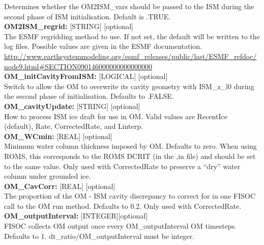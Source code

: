 \documentclass[12pt]{article}
\begin{document}
\begin{flushleft}
Determines whether the OM2ISM\_vars should be passed to the ISM during the 
second phase of ISM initialisation.   Default is .TRUE.                    \\ 
\vspace{6pt}
\textbf{OM2ISM\_regrid:}       [STRING] [optional]                         \\
The ESMF regridding method to use.  If not set, the default will be 
written to the log files.  Possible values are given in the ESMF 
documentation. 
\url{http://www.earthsystemmodeling.org/esmf_releases/public/last/ESMF_refdoc/node9.html#SECTION090146000000000000000}                                        \\
\vspace{6pt}
\textbf{OM\_initCavityFromISM:}  [LOGICAL] [optional]                      \\
Switch to allow the OM to overwrite its cavity geometry with ISM\_z\_l0 
during the second phase of initialisation.
Defaults to .FALSE.                                                        \\
\vspace{6pt}
\textbf{OM\_cavityUpdate:}   [STRING] [optional]                           \\
How to process ISM ice draft for use in OM.  Valid values are RecentIce    \\
(default), Rate, CorrectedRate, and Linterp.                               \\
\vspace{6pt}
\textbf{OM\_WCmin:}  [REAL] [optional]                                     \\
Minimum water column thickness imposed by OM.  Defaults to zero.  When 
using ROMS, this corresponds to the ROMS DCRIT (in the ,in file) and 
should be set to the same value.  Only used with CorrectedRate to 
preserve a ``dry'' water column under grounded ice.                        \\
\vspace{6pt}
\textbf{OM\_CavCorr:}  [REAL] [optional]                                   \\
The proportion of the OM - ISM cavity discrepancy to correct for in one 
FISOC call to the  OM run method.  Defaults to 0.2.  Only used with 
CorrectedRate.                                                             \\
\vspace{6pt}
\textbf{OM\_outputInterval:} [INTEGER][optional]                           \\
FISOC collects OM output once every OM\_outputInterval OM timesteps. 
Defaults to 1.  dt\_ratio/OM\_outputInterval must be integer.              \\
\vspace{22pt}



\end{flushleft}
\end{document}
